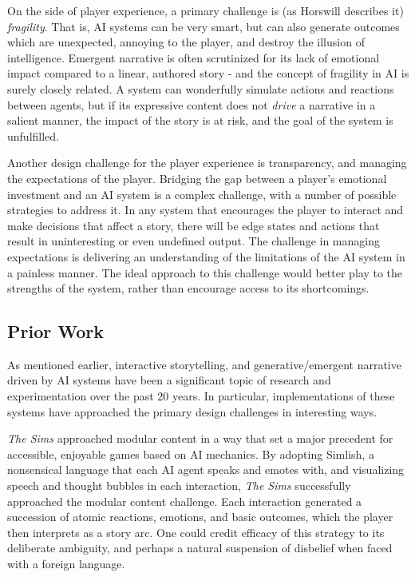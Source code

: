 \documentclass[letterpaper, 10 pt, conference]{ieeeconf}  %
\begin{document}
	On the side of player experience, a primary challenge is (as Horswill describes it) \emph{fragility}. That is, AI systems can be very smart, but can also generate outcomes which are unexpected, annoying to the player, and destroy the illusion of intelligence. Emergent narrative is often scrutinized for its lack of emotional impact compared to a linear, authored story - and the concept of fragility in AI is surely closely related. A system can wonderfully simulate actions and reactions between agents, but if its expressive content does not \emph{drive} a narrative in a salient manner, the impact of the story is at risk, and the goal of the system is unfulfilled. 
	
	Another design challenge for the player experience is transparency, and managing the expectations of the player. Bridging the gap between a player's emotional investment and an AI system is a complex challenge, with a number of possible strategies to address it. In any system that encourages the player to interact and make decisions that affect a story, there will be edge states and actions that result in uninteresting or even undefined output. The challenge in managing expectations is delivering an understanding of the limitations of the AI system in a painless manner. The ideal approach to this challenge would better play to the strengths of the system, rather than encourage access to its shortcomings.
	
\subsection{Prior Work}
	As mentioned earlier, interactive storytelling, and generative/emergent narrative driven by AI systems have been a significant topic of research and experimentation over the past 20 years. In particular, implementations of these systems have approached the primary design challenges in interesting ways.
	
	\emph{The Sims} approached modular content in a way that set a major precedent for accessible, enjoyable games based on AI mechanics. By adopting Simlish, a nonsensical language that each AI agent speaks and emotes with, and visualizing speech and thought bubbles in each interaction, \emph{The Sims} successfully approached the modular content challenge. Each interaction generated a succession of atomic reactions, emotions, and basic outcomes, which the player then interprets as a story arc. One could credit efficacy of this strategy to its deliberate ambiguity, and perhaps a natural suspension of disbelief when faced with a foreign language.
	
\end{document}
